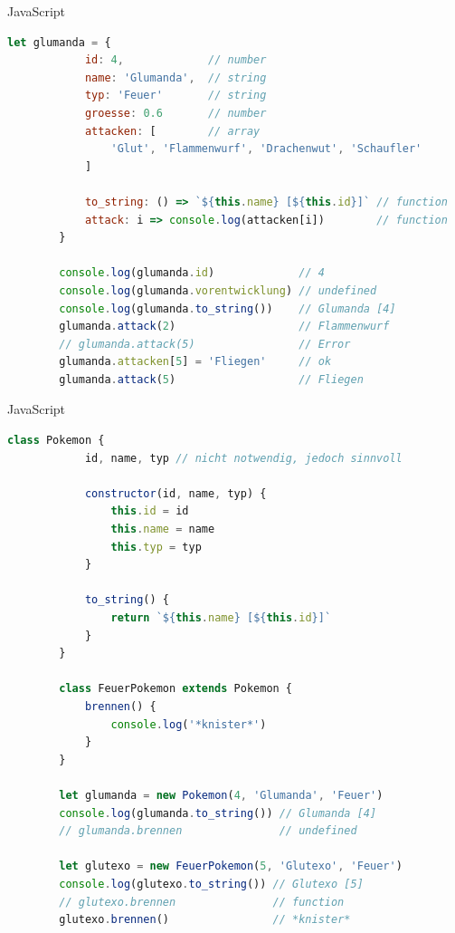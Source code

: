\begin{example}{JavaScript}
    \begin{lstlisting}[language=JavaScript]
        let glumanda = {
            id: 4,             // number
            name: 'Glumanda',  // string
            typ: 'Feuer'       // string
            groesse: 0.6       // number
            attacken: [        // array
                'Glut', 'Flammenwurf', 'Drachenwut', 'Schaufler'
            ]

            to_string: () => `${this.name} [${this.id}]` // function
            attack: i => console.log(attacken[i])        // function
        }

        console.log(glumanda.id)             // 4
        console.log(glumanda.vorentwicklung) // undefined
        console.log(glumanda.to_string())    // Glumanda [4]
        glumanda.attack(2)                   // Flammenwurf
        // glumanda.attack(5)                // Error
        glumanda.attacken[5] = 'Fliegen'     // ok
        glumanda.attack(5)                   // Fliegen
    \end{lstlisting}
\end{example}

\begin{example}{JavaScript}
    \begin{lstlisting}[language=JavaScript]
        class Pokemon {
            id, name, typ // nicht notwendig, jedoch sinnvoll

            constructor(id, name, typ) {
                this.id = id
                this.name = name
                this.typ = typ
            }

            to_string() {
                return `${this.name} [${this.id}]`
            }
        }

        class FeuerPokemon extends Pokemon {
            brennen() {
                console.log('*knister*')
            }
        }

        let glumanda = new Pokemon(4, 'Glumanda', 'Feuer')
        console.log(glumanda.to_string()) // Glumanda [4]
        // glumanda.brennen               // undefined

        let glutexo = new FeuerPokemon(5, 'Glutexo', 'Feuer')
        console.log(glutexo.to_string()) // Glutexo [5]
        // glutexo.brennen               // function
        glutexo.brennen()                // *knister*
    \end{lstlisting}
\end{example}

